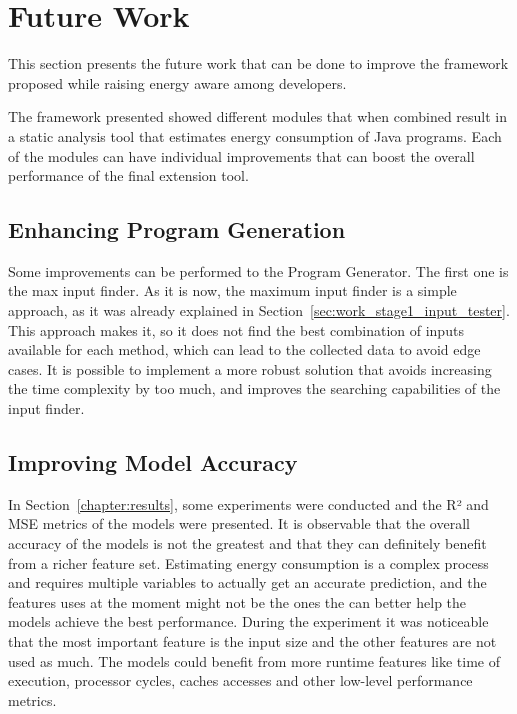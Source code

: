 \chapter{Future Work}\label{chapter:future_work}

This section presents the future work that can be done to improve the framework proposed while raising energy aware among developers.

The framework presented showed different modules that when combined result in a static analysis tool that estimates energy consumption of Java programs. Each of the modules can have individual improvements that can boost the overall performance of the final extension tool.


\section{Enhancing Program Generation} \label{sec:future_work_enhancing_program_generation}

Some improvements can be performed to the Program Generator. The first one is the max input finder. As it is now, the maximum input finder is a simple approach, as it was already explained in Section~\ref{sec:work_stage1_input_tester}. This approach makes it, so it does not find the best combination of inputs available for each method, which can lead to the collected data to avoid edge cases. It is possible to implement a more robust solution that avoids increasing the time complexity by too much, and improves the searching capabilities of the input finder.

\section{Improving Model Accuracy} \label{sec:future_work_improving_model_accuracy}

In Section~\ref{chapter:results}, some experiments were conducted and the R² and MSE metrics of the models were presented. It is observable that the overall accuracy of the models is not the greatest and that they can definitely benefit from a richer feature set. Estimating energy consumption is a complex process and requires multiple variables to actually get an accurate prediction, and the features uses at the moment might not be the ones the can better help the models achieve the best performance. During the experiment it was noticeable that the most important feature is the input size and the other features are not used as much. The models could benefit from more runtime features like time of execution, processor cycles, caches accesses and other low-level performance metrics.


